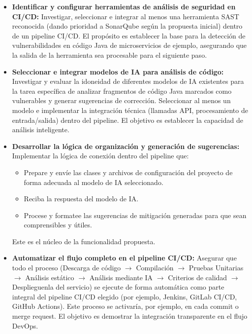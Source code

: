 \begin{itemize}
    \item \textbf{Identificar y configurar herramientas de análisis de seguridad en CI/CD:} Investigar, seleccionar e integrar al menos una herramienta SAST reconocida (dando prioridad a SonarQube según la propuesta inicial) dentro de un pipeline CI/CD. El propósito es establecer la base para la detección de vulnerabilidades en código Java de microservicios de ejemplo, asegurando que la salida de la herramienta sea procesable para el siguiente paso.
    
    \item \textbf{Seleccionar e integrar modelos de IA para análisis de código:} Investigar y evaluar la idoneidad de diferentes modelos de IA existentes para la tarea específica de analizar fragmentos de código Java marcados como vulnerables y generar sugerencias de corrección. Seleccionar al menos un modelo e implementar la integración técnica (llamadas API, procesamiento de entrada/salida) dentro del pipeline. El objetivo es establecer la capacidad de análisis inteligente.
    
    \item \textbf{Desarrollar la lógica de organización y generación de sugerencias:} Implementar la lógica de conexión dentro del pipeline que:
    \begin{itemize}
        \item Prepare y envíe las clases y archivos de configuración del proyecto de forma adecuada al modelo de IA seleccionado.
        \item Reciba la respuesta del modelo de IA.
        \item Procese y formatee las sugerencias de mitigación generadas para que sean comprensibles y útiles.
    \end{itemize}
    Este es el núcleo de la funcionalidad propuesta.
    
    \item \textbf{Automatizar el flujo completo en el pipeline CI/CD:} Asegurar que todo el proceso (Descarga de código $\rightarrow$ Compilación $\rightarrow$ Pruebas Unitarias $\rightarrow$ Análisis estático $\rightarrow$ Análisis mediante IA $\rightarrow$ Criterios de calidad $\rightarrow$  Desplieguenla del servicio) se ejecute de forma automática como parte integral del pipeline CI/CD elegido (por ejemplo, Jenkins, GitLab CI/CD, GitHub Actions). Este proceso se activaría, por ejemplo, en cada commit o merge request. El objetivo es demostrar la integración transparente en el flujo DevOps.
    

\end{itemize}
